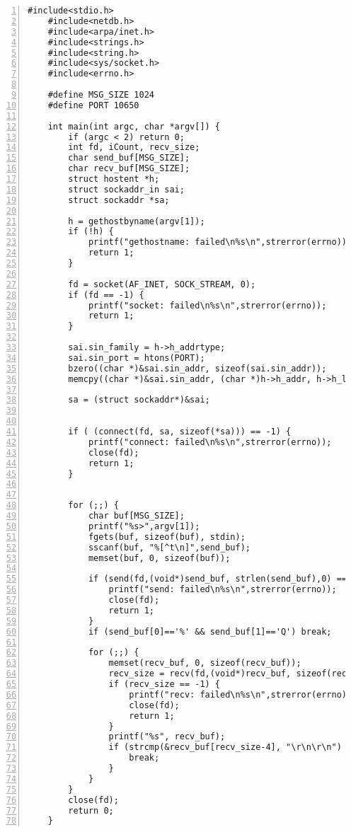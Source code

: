 \documentclass[11pt]{jarticle}
\begin{document}
\begin{lstlisting}[caption=クライアント側プログラム,label=client,numbers=left]
    #include<stdio.h>
    #include<netdb.h>
    #include<arpa/inet.h>
    #include<strings.h>
    #include<string.h>
    #include<sys/socket.h>
    #include<errno.h>

    #define MSG_SIZE 1024
    #define PORT 10650

    int main(int argc, char *argv[]) {
        if (argc < 2) return 0;
        int fd, iCount, recv_size;
        char send_buf[MSG_SIZE];
        char recv_buf[MSG_SIZE];
        struct hostent *h;
        struct sockaddr_in sai;
        struct sockaddr *sa;

        h = gethostbyname(argv[1]);
        if (!h) {
            printf("gethostname: failed\n%s\n",strerror(errno));
            return 1;
        }

        fd = socket(AF_INET, SOCK_STREAM, 0);
        if (fd == -1) {
            printf("socket: failed\n%s\n",strerror(errno));
            return 1;
        }

        sai.sin_family = h->h_addrtype;
        sai.sin_port = htons(PORT);
        bzero((char *)&sai.sin_addr, sizeof(sai.sin_addr));
        memcpy((char *)&sai.sin_addr, (char *)h->h_addr, h->h_length);
            
        sa = (struct sockaddr*)&sai;
        

        if ( (connect(fd, sa, sizeof(*sa))) == -1) {
            printf("connect: failed\n%s\n",strerror(errno));
            close(fd);
            return 1;
        }


        for (;;) {
            char buf[MSG_SIZE];
            printf("%s>",argv[1]);
            fgets(buf, sizeof(buf), stdin);
            sscanf(buf, "%[^t\n]",send_buf);
            memset(buf, 0, sizeof(buf));
            
            if (send(fd,(void*)send_buf, strlen(send_buf),0) == -1) {
                printf("send: failed\n%s\n",strerror(errno));
                close(fd);
                return 1;
            }
            if (send_buf[0]=='%' && send_buf[1]=='Q') break;

            for (;;) {
                memset(recv_buf, 0, sizeof(recv_buf));
                recv_size = recv(fd,(void*)recv_buf, sizeof(recv_buf), 0);
                if (recv_size == -1) {
                    printf("recv: failed\n%s\n",strerror(errno));
                    close(fd);
                    return 1;
                }
                printf("%s", recv_buf);
                if (strcmp(&recv_buf[recv_size-4], "\r\n\r\n") == 0) {
                    break;
                }
            }
        }    
        close(fd);
        return 0;
    }

\end{lstlisting}
\end{document}
